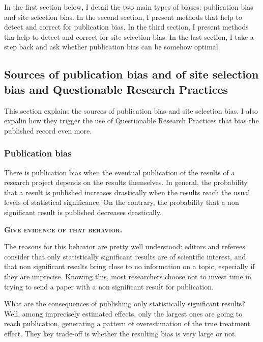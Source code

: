 \documentclass[
]{book}
\theoremstyle{definition}
\theoremstyle{definition}
\theoremstyle{definition}
\theoremstyle{definition}
\theoremstyle{remark}
\begin{document}
In the first section below, I detail the two main types of biases: publication bias and site selection bias.
In the second section, I present methods that help to detect and correct for publication bias.
In the third section, I present methods tha help to detect and correct for site selection bias.
In the last section, I take a step back and ask whether publication bias can be somehow optimal.

\hypertarget{sources-of-publication-bias-and-of-site-selection-bias-and-questionable-research-practices}{%
\subsection{Sources of publication bias and of site selection bias and Questionable Research Practices}\label{sources-of-publication-bias-and-of-site-selection-bias-and-questionable-research-practices}}

This section explains the sources of publication bias and site selection bias.
I also expalin how they trigger the use of Questionable Research Practices that bias the published record even more.

\hypertarget{publication-bias-1}{%
\subsubsection{Publication bias}\label{publication-bias-1}}

There is publication bias when the eventual publication of the results of a research project depends on the results themselves.
In general, the probability that a result is published increases drastically when the results reach the usual levels of statistical significance.
On the contrary, the probability that a non significant result is published decreases drastically.

\textbf{\textsc{Give evidence of that behavior.}}

The reasons for this behavior are pretty well understood: editors and referees consider that only statistically significant results are of scientific interest, and that non significant results bring close to no information on a topic, especially if they are imprecise.
Knowing this, most researchers choose not to invest time in trying to send a paper with a non significant result for publication.

What are the consequences of publishing only statistically significant results?
Well, among imprecisely estimated effects, only the largest ones are going to reach publication, generating a pattern of overestimation of the true treatment effect.
They key trade-off is whether the resulting bias is very large or not.
\end{document}
